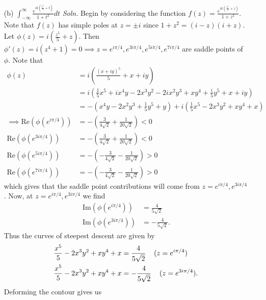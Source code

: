 \documentclass{article}
\begin{document}
\begin{itemize}
\begin{itemize}
        \item[(b)] ${\displaystyle \int_{-\infty}^{\infty} \frac{e^{ik\left(\frac{t^5}{5} + t\right)}}{1 + t^2} dt}$
        \newline\newline
        \textit{Soln.} Begin by considering the function $f(z) = \frac{e^{ik\left(\frac{z^5}{5} + z\right)}}{1 + z^2}$. Note that $f(z)$ has simple poles at $z = \pm i$ since $1 + z^2 = (i - z)(i + z)$. Let $\phi(z) = i\left(\frac{z^5}{5} + z\right)$. Then $\phi'(z) = i(z^4 + 1) = 0 \implies z = e^{i\pi/4}, e^{3i\pi/4}, e^{5i\pi/4}, e^{7i\pi/4}$ are saddle points of $\phi$. Note that
        \begin{align*}
            \phi(z) &= i\left(\frac{(x + iy)^5}{5} + x + iy\right)\\
            &= i\left(\frac{1}{5}x^5 + ix^4y - 2x^3y^2 - 2ix^2y^3 + xy^4 + \frac{i}{5}y^5 + x + iy\right)\\
            &= -\left(x^4y - 2x^2y^3 + \frac{1}{5}y^5 + y\right) + i\left(\frac{1}{5}x^5 - 2x^3y^2 + xy^4 + x\right)\\
            \implies \text{Re}(\phi(e^{i\pi/4})) &= -\left(\frac{3}{4\sqrt{2}} + \frac{1}{20\sqrt{2}}\right) < 0\\
            \text{Re}(\phi(e^{3i\pi/4})) &= -\left(\frac{3}{4\sqrt{2}} + \frac{1}{20\sqrt{2}}\right) < 0\\
            \text{Re}(\phi(e^{5i\pi/4})) &= -\left(-\frac{3}{4\sqrt{2}} - \frac{1}{20\sqrt{2}}\right) > 0\\
            \text{Re}(\phi(e^{7i\pi/4})) &= -\left(-\frac{3}{4\sqrt{2}} - \frac{1}{20\sqrt{2}}\right) > 0
        \end{align*}
        which gives that the saddle point contributions will come from $z = e^{i\pi/4}, e^{3i\pi/4}$. Now, at $z = e^{i\pi/4},e^{3i\pi/4}$ we find
        \begin{align*}
            \text{Im}(\phi(e^{i\pi/4})) &= \frac{4}{5\sqrt{2}}\\
            \text{Im}(\phi(e^{3i\pi/4})) &= -\frac{4}{5\sqrt{2}}.
        \end{align*}
        Thus the curves of steepest descent are given by
        \begin{align*}
            \frac{x^5}{5} - 2x^3y^2 + xy^4 + x &= \frac{4}{5\sqrt{2}} \hspace{0.4cm} (z = e^{i\pi/4})\\
            \frac{x^5}{5} - 2x^3y^2 + xy^4 + x &= -\frac{4}{5\sqrt{2}} \hspace{0.4cm} (z = e^{3i\pi/4}).
        \end{align*}
        Deforming the contour gives us


\end{itemize}
\end{itemize}
\end{document}
